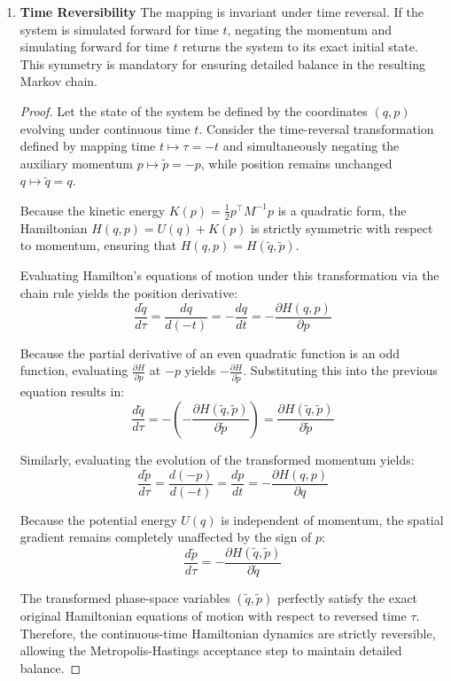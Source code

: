 \documentclass[12pt,oneside]{report}
\theoremstyle{definition}
\theoremstyle{remark}
\begin{document}
\begin{enumerate}
\begin{proof}
By Clairaut's theorem, the second partial derivatives of $H$ are equal if $H$ is smooth and continuous. Thereby, the two terms cancel, and the divergence becomes zero. This symplectic property is vital because it implies that the determinant of the Jacobian of the Hamiltonian flow is strictly equal to 1, completely bypassing the need to compute complex Jacobian determinants during the Metropolis acceptance step.

\end{proof}
	\item \textbf{Time Reversibility} 
The mapping is invariant under time reversal. If the system is simulated forward for time $t$, negating the momentum and simulating forward for time $t$ returns the system to its exact initial state. This symmetry is mandatory for ensuring detailed balance in the resulting Markov chain.

\begin{proof}
Let the state of the system be defined by the coordinates $(q, p)$ evolving under continuous time $t$. Consider the time-reversal transformation defined by mapping time $t \mapsto \tau = -t$ and simultaneously negating the auxiliary momentum $p \mapsto \tilde{p} = -p$, while position remains unchanged $q \mapsto \tilde{q} = q$. 

Because the kinetic energy $K(p) = \frac{1}{2} p^\top M^{-1} p$ is a quadratic form, the Hamiltonian $H(q, p) = U(q) + K(p)$ is strictly symmetric with respect to momentum, ensuring that $H(q, p) = H(\tilde{q}, \tilde{p})$. 

Evaluating Hamilton's equations of motion under this transformation via the chain rule yields the position derivative:
$$ \frac{d\tilde{q}}{d\tau} = \frac{dq}{d(-t)} = -\frac{dq}{dt} = -\frac{\partial H(q, p)}{\partial p} $$

Because the partial derivative of an even quadratic function is an odd function, evaluating $\frac{\partial H}{\partial p}$ at $-p$ yields $-\frac{\partial H}{\partial \tilde{p}}$. Substituting this into the previous equation results in:
$$ \frac{d\tilde{q}}{d\tau} = -\left( -\frac{\partial H(\tilde{q}, \tilde{p})}{\partial \tilde{p}} \right) = \frac{\partial H(\tilde{q}, \tilde{p})}{\partial \tilde{p}} $$

Similarly, evaluating the evolution of the transformed momentum yields:
$$ \frac{d\tilde{p}}{d\tau} = \frac{d(-p)}{d(-t)} = \frac{dp}{dt} = -\frac{\partial H(q, p)}{\partial q} $$

Because the potential energy $U(q)$ is independent of momentum, the spatial gradient remains completely unaffected by the sign of $p$:
$$ \frac{d\tilde{p}}{d\tau} = -\frac{\partial H(\tilde{q}, \tilde{p})}{\partial \tilde{q}} $$

The transformed phase-space variables $(\tilde{q}, \tilde{p})$ perfectly satisfy the exact original Hamiltonian equations of motion with respect to reversed time $\tau$. Therefore, the continuous-time Hamiltonian dynamics are strictly reversible, allowing the Metropolis-Hastings acceptance step to maintain detailed balance. 
\end{proof}

\end{enumerate}
\end{document}

